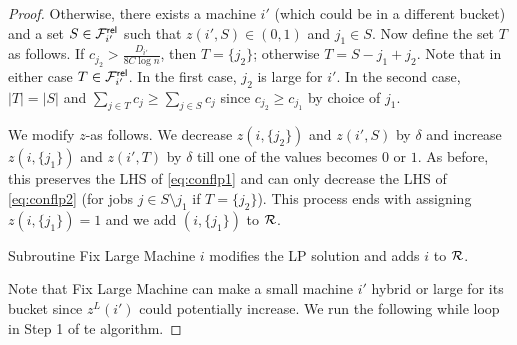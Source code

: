 \documentclass{article}[11pt]
\begin{document}
\begin{proof}
	Otherwise, there exists a machine $i'$ (which could be in a different bucket) and a set $S\in {\cal F}^{\mathsf{rel}}_{i'}$ such that $z(i',S) \in (0,1)$ and $j_1 \in S$. 
	Now define the set $T$ as follows. If $c_{j_2} > \frac{D_{i'}}{8C\log n}$, then $T = \{j_2\}$; otherwise $T = S - j_1 + j_2$. Note that in either case $T \in {\cal F}^{\mathsf{rel}}_{i'}$.
	In the first case, $j_2$ is large for $i'$. In the second case, $|T| = |S|$ and $\sum_{j\in T} c_j \ge \sum_{j\in S} c_j$ since $c_{j_2} \geq c_{j_1}$ by choice of $j_1$.
	
	We modify $z$-as follows. We decrease $z(i,\{j_2\})$ and $z(i',S)$ by $\delta$ and increase $z(i,\{j_1\})$ and $z(i',T)$ by $\delta$ till one of the values becomes $0$ or $1$. 
	As before, this preserves the LHS of \eqref{eq:conflp1} and can only decrease the LHS of \eqref{eq:conflp2} (for jobs $j\in S\setminus j_1$ if $T = \{j_2\}$).
   This process ends with assigning $z(i,\{j_1\}) = 1$ and we add $(i,\{j_1\})$ to ${\cal R}$.
   
   \begin{claim}\label{clm:002}
Subroutine Fix Large  Machine $i$ modifies the LP solution and adds $i$ to ${\cal R}$. 
   	\end{claim}
   \noindent
   Note that Fix Large Machine can make a small machine $i'$ hybrid or large for its bucket since $z^L(i')$ could potentially increase.  
   We run the following while loop in Step 1 of te algorithm.
   

\end{proof}
\end{document}
